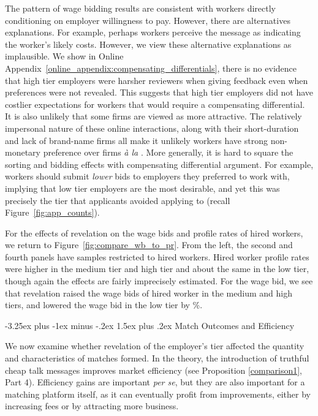 \documentclass[12pt]{article}
\makeatletter
\renewcommand{\section}{%
  \@startsection{section}{1}{\z@}%
  {-3.5ex plus -1ex minus -.2ex}%
  {2.3ex plus.2ex}%
  {\normalfont\Large\bfseries}%
}
\renewcommand{\subsection}{%
  \@startsection{subsection}{2}{\z@}%
  {-3.25ex plus -1ex minus -.2ex}%
  {1.5ex plus .2ex}%
  {\normalfont\large\bfseries}%
}
\makeatother
\begin{document}
The pattern of wage bidding results are consistent with workers directly conditioning on employer willingness to pay.
However, there are alternatives explanations.
For example, perhaps workers perceive the message as indicating the worker's likely costs.
However, we view these alternative explanations as implausible. 
We show in Online Appendix~\ref{online_appendix:compensating_differentials}, there is no evidence that high tier employers were harsher reviewers when giving feedback even when preferences were not revealed.
This suggests that high tier employers did not have costlier expectations for workers that would require a compensating differential. 
It is also unlikely that some firms are viewed as more attractive.
The relatively impersonal nature of these online interactions, along with their short-duration and lack of brand-name firms all make it unlikely workers have strong non-monetary preference over firms \emph{\`{a} la} \cite{sorkin2018ranking}. 
More generally, it is hard to square the sorting and bidding effects with compensating differential argument. 
For example, workers should submit \emph{lower} bids to employers they preferred to work with, implying that low tier employers are the most desirable, and yet this was precisely the tier that applicants avoided applying to (recall Figure~\ref{fig:app_counts}).

For the effects of revelation on the wage bids and profile rates of hired workers, we return to Figure~\ref{fig:compare_wb_to_pr}.
From the left, the second and fourth panels have samples restricted to hired workers. 
Hired worker profile rates were higher in the medium tier and high tier and about the same in the low tier, though again the effects are fairly imprecisely estimated.
For the wage bid, we see that revelation raised the wage bids of hired worker in the medium and high tiers, and lowered the wage bid in the low tier by \EffectWageBidAppLowTierHiredRegression{}\%. 


\subsection{Match Outcomes and Efficiency} %

We now examine whether revelation of the employer's tier affected the quantity and characteristics of matches formed.
In the theory, the introduction of truthful cheap talk messages improves market efficiency (see Proposition \ref{comparison1}, Part 4).
Efficiency gains are important \emph{per se}, but they are also important for a matching platform itself, as it can eventually profit from improvements, either by increasing fees or by attracting more business. 
\end{document}
